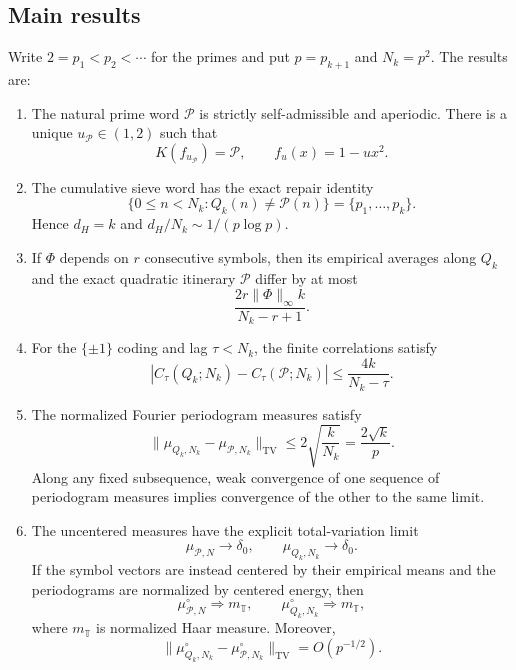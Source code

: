 \documentclass[11pt]{article}
\theoremstyle{definition}
\theoremstyle{remark}
\newcommand{\T}{\mathbb{T}}
\newcommand{\cP}{\mathcal{P}}
\newcommand{\uP}{u_{\mathcal P}}
\newcommand{\TV}{\mathrm{TV}}
\begin{document}
\subsection*{Main results}

Write $2=p_1<p_2<\cdots$ for the primes and put $p=p_{k+1}$ and $N_k=p^2$.  The results are:

\begin{enumerate}[label=\textbf{R\arabic*.},leftmargin=3.2em]
    \item The natural prime word $\cP$ is strictly self-admissible and aperiodic.  There is a unique $\uP\in(1,2)$ such that
    \[
        K(f_{\uP})=\cP,
        \qquad f_u(x)=1-u x^2.
    \]

    \item The cumulative sieve word has the exact repair identity
    \[
        \{0\le n<N_k:Q_k(n)\ne\cP(n)\}
        =\{p_1,\ldots,p_k\}.
    \]
    Hence $d_H=k$ and $d_H/N_k\sim1/(p\log p)$.

    \item If $\Phi$ depends on $r$ consecutive symbols, then its empirical averages along $Q_k$ and the exact quadratic itinerary $\cP$ differ by at most
    \[
        \frac{2r\|\Phi\|_\infty k}{N_k-r+1}.
    \]

    \item For the $\{\pm1\}$ coding and lag $\tau<N_k$, the finite correlations satisfy
    \[
        |C_\tau(Q_k;N_k)-C_\tau(\cP;N_k)|
        \le \frac{4k}{N_k-\tau}.
    \]

    \item The normalized Fourier periodogram measures satisfy
    \[
        \|\mu_{Q_k,N_k}-\mu_{\cP,N_k}\|_{\TV}
        \le 2\sqrt{\frac{k}{N_k}}
        =\frac{2\sqrt{k}}{p}.
    \]
    Along any fixed subsequence, weak convergence of one sequence of periodogram measures implies convergence of the other to the same limit.

    \item The uncentered measures have the explicit total-variation limit
    \[
        \mu_{\cP,N}\longrightarrow\delta_0,
        \qquad
        \mu_{Q_k,N_k}\longrightarrow\delta_0.
    \]
    If the symbol vectors are instead centered by their empirical means and the periodograms are normalized by centered energy, then
    \[
        \mu^{\circ}_{\cP,N}\Rightarrow m_{\T},
        \qquad
        \mu^{\circ}_{Q_k,N_k}\Rightarrow m_{\T},
    \]
    where $m_{\T}$ is normalized Haar measure.  Moreover,
    \[
        \|\mu^{\circ}_{Q_k,N_k}-\mu^{\circ}_{\cP,N_k}\|_{\TV}
        =O(p^{-1/2}).
    \]
\end{enumerate}
\end{document}
